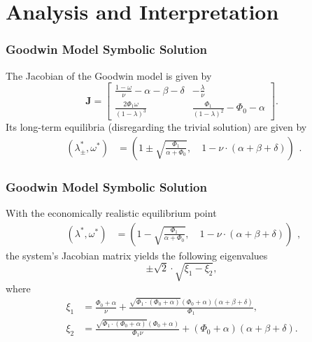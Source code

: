 \documentclass{beamer}
\begin{document}
\section{Analysis and Interpretation}
\begin{frame}
\frametitle{Goodwin Model Symbolic Solution}
The Jacobian of the Goodwin model is given by
\begin{equation} \label{eq:jac_good}
    \mathbf J = \begin{bmatrix}
        \frac{1-\omega}{\nu}-\alpha-\beta-\delta & -\frac{\lambda}{\nu}\\[1ex]
        \frac{2\Phi_1\omega}{(1-\lambda)^3} & \frac{\Phi_1}{(1-\lambda)^2}-\Phi_0-\alpha
\end{bmatrix}.
\end{equation}
Its long-term equilibria (disregarding the trivial solution) are given by
\begin{equation} \label{eq:goodwin_eqm}
\begin{split}
    (\lambda_\pm^\ast, \omega^\ast) &= \left(1\pm\sqrt{\frac{\Phi_1}{\alpha + \Phi_0}},\quad  1-\nu\cdot(\alpha + \beta + \delta)\right)
\end{split}.
\end{equation}
\end{frame}
\begin{frame}
\frametitle{Goodwin Model Symbolic Solution}
With the economically realistic equilibrium point
\begin{equation} \label{eq:goodwin_eqm_valid}
\begin{split}
    (\lambda^\ast, \omega^\ast) &= \left(1-\sqrt{\frac{\Phi_1}{\alpha + \Phi_0}},\quad  1-\nu\cdot(\alpha + \beta + \delta)\right)
\end{split},
\end{equation}
the system's Jacobian matrix yields the following eigenvalues
\begin{equation} \label{eq:goodwin_eig}
    \pm\sqrt 2\cdot\sqrt{\xi_1 - \xi_2},
\end{equation}
where
\footnotesize
\begin{equation}
\begin{split}
    \xi_1 &= \frac{\Phi_0 + \alpha}{\nu} + \frac{\sqrt{\Phi_1\cdot(\Phi_0 + \alpha)}(\Phi_0+\alpha)(\alpha+\beta+\delta)}{\Phi_1},\\
    \xi_2 &= \frac{\sqrt{\Phi_1\cdot(\Phi_0 + \alpha)}(\Phi_0 + \alpha)}{\Phi_1\nu} + (\Phi_0+\alpha)(\alpha+\beta+\delta).
\end{split}
\end{equation}
\normalsize
\end{frame}
\end{document}
